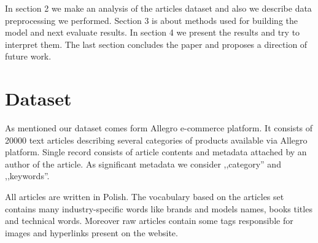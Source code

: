 \documentclass[twoside,twocolumn]{article}
\begin{document}
	In section 2 we make an analysis of the articles dataset and also we describe data preprocessing we performed. Section 3 is about methods used for building the model and next evaluate results. In section 4 we present the results and try to interpret them. The last section concludes the paper and proposes a direction of future work.
	\section{Dataset}
	
	As mentioned our dataset comes form Allegro e-commerce platform. It consists of 20000 text articles describing several categories of products available via Allegro platform. Single record consists of article contents and metadata attached by an author of the article. As significant metadata we consider ,,category'' and ,,keywords''.
	
	
	All articles are written in Polish. The vocabulary based on the articles set contains many industry-specific words like brands and models names, books titles and technical words. Moreover raw articles contain some tags responsible for images and hyperlinks present on the website.
	
\end{document}
